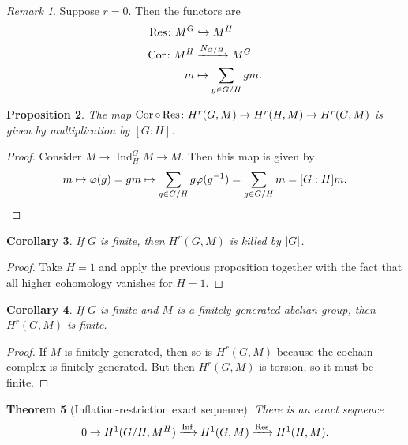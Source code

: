 \documentclass[leqno, openany]{memoir}
\newtheorem{thm}{Theorem}[section]
\newtheorem{cor}[thm]{Corollary}
\newtheorem{prop}[thm]{Proposition}
\theoremstyle{definition}
\theoremstyle{remark}
\newtheorem{rmk}[thm]{Remark}
\theoremstyle{plain}
\theoremstyle{definition}
\theoremstyle{remark}
\DeclareMathOperator{\Ind}{Ind}
\DeclareMathOperator{\Inf}{Inf}
\DeclareMathOperator{\Cor}{Cor}
\begin{document}
\begin{rmk} Suppose $r = 0$. Then the functors are \begin{align*} \Res \colon
M^G &\hookrightarrow M^H \\ \Cor \colon M^H &\xrightarrow{N_{G/H}} M^G \\ m
    &\mapsto \sum_{g \in G/H} gm.  \end{align*} \end{rmk}

\begin{prop} The map $\Cor \circ \Res \colon H^r(G, M) \to H^r(H, M) \to H^r(G,
M)$ is given by multiplication by $[G:H]$.  \end{prop}

\begin{proof} Consider $M \to \Ind_H^G M \to M$. Then this map is given by \[ m
\mapsto \varphi(g) = gm \mapsto \sum_{g \in G/H} g \varphi(g^{-1}) = \sum_{g
\in G/H} m = [G:H]m. \qedhere \] \end{proof}

\begin{cor} If $G$ is finite, then $H^r(G, M)$ is killed by $\abs{G}$.
\end{cor}

\begin{proof} Take $H = 1$ and apply the previous proposition together with the
fact that all higher cohomology vanishes for $H = 1$.  \end{proof}

\begin{cor} If $G$ is finite and $M$ is a finitely generated abelian group,
then $H^r(G, M)$ is finite.  \end{cor}

\begin{proof} If $M$ is finitely generated, then so is $H^r(G, M)$ because the
cochain complex is finitely generated. But then $H^r(G, M)$ is torsion, so it
must be finite.  \end{proof}

\begin{thm}[Inflation-restriction exact sequence] There is an exact sequence \[
0 \to H^1(G/H, M^H) \xrightarrow{\Inf} H^1(G, M) \xrightarrow{\Res} H^1(H, M).
\] \end{thm}
\end{document}
